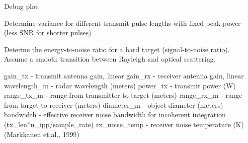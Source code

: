 \documentclass[letterpaper,10pt,english]{sphinxmanual}
\begin{document}

\begin{fulllineitems}
\label{\detokenize{modules/debris:debris.debug_tx_len_sweep2}}
Debug plot

Determine variance for different transmit pulse lengths with fixed
peak power (less SNR for shorter pulses)

\end{fulllineitems}


\begin{fulllineitems}
\label{\detokenize{modules/debris:debris.hard_target_enr}}
Deterine the energy-to-noise ratio for a hard target (signal-to-noise ratio).
Assume a smooth transition between Rayleigh and optical scattering.

gain\_tx - transmit antenna gain, linear
gain\_rx - receiver antenna gain, linear
wavelength\_m - radar wavelength (meters)
power\_tx - transmit power (W)
range\_tx\_m - range from transmitter to target (meters)
range\_rx\_m - range from target to receiver (meters)
diameter\_m - object diameter (meters)
bandwidth - effective receiver noise bandwidth for incoherent integration (tx\_len*n\_ipp/sample\_rate)
rx\_noise\_temp - receiver noise temperature (K)
(Markkanen et.al., 1999)

\end{fulllineitems}


\begin{fulllineitems}
\label{\detokenize{modules/debris:debris.ionospheric_error_fun}}
\end{fulllineitems}
\end{document}
